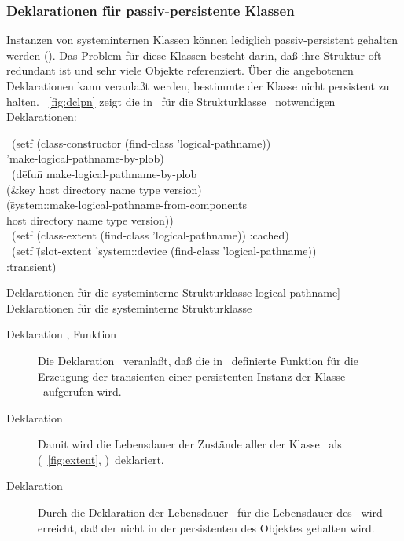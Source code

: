 \subsubsection{Deklarationen f\"{u}r passiv-persistente Klassen}
%
Instanzen von systeminternen Klassen k\"{o}n\-nen lediglich
passiv-persistent gehalten werden \ifbericht%
\cite[]{bib:ki94a}%
\else%
(\citepage{\pageref{sec:nrmlp}})\fi.
Das Problem f\"{u}r diese Klassen besteht darin, da\ss{} ihre Struktur oft
redundant ist und sehr viele Objekte referenziert. \"{U}ber die
angebotenen Deklarationen kann 
veranla\ss{}t werden, bestimmte
\Slt[s]\/ der Klasse nicht persistent zu halten.
\figurename~\ref{fig:dclpn}
zeigt die in \lw\ f\"{u}r die Strukturklasse
\ notwendigen Deklarationen:
%
\begin{listing}%
\oi\   (setf \=(class-constructor (find-class 'logical-pathname))\\
             \>'make-logical-pathname-by-plob)\\
\oii\  (d\=efu\=n make-logical-pathname-by-plob\\
         \>   \>(\&key host directory name type version)\\
         \>(\=system::make-logical-pathname-from-components\\
         \> \>host directory name type version))\\
\oiii\ (setf (class-extent (find-class 'logical-pathname))
             :cached)\\
\oiv\  (setf \=(slot-extent 'system::device
                            (find-class 'logical-pathname))\\
             \>:transient)
\caption%
 [Deklarationen f\"{u}r die systeminterne Strukturklasse
  \protect\rglq{}logical-pathname\protect\rgrq]%
 {Deklarationen f\"{u}r die systeminterne Strukturklasse
  \protect{}}%
\label{fig:dclpn}%
\end{listing}%
%
\begin{description}
%
\item[Deklaration \oi, Funktion \oii]
Die Deklaration \oi\ veranla\ss{}t, da\ss{} die in \oii\ definierte Funktion
f\"{u}r die Erzeugung der transienten \representation{} einer persistenten
Instanz der Klasse \ aufgerufen wird.
%
\item[Deklaration \oiii]
Damit wird die Lebensdauer der Zust\"{a}nde aller \Slt[s]\/ der Klasse
\ als
\ \ifbericht%
\cite[]{bib:ki94a}%
\else%
(\figurename~\ref{fig:extent},
\citepage{\pageref{fig:extent}})\fi\ deklariert.
%
\item[Deklaration \oiv]
Durch die Deklaration der Lebensdauer \ f\"{u}r die
Lebensdauer des \Slt[s]\/ \ wird erreicht, da\ss{}
der \Slt\/ nicht in der persistenten \representation{} des Objektes
gehalten wird.
%
\end{description}
